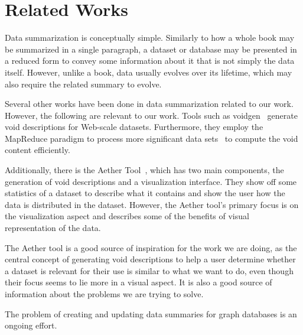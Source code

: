 \section{Related Works}\label{sec:related-works}
Data summarization is conceptually simple. Similarly to how a whole book may be summarized in a single paragraph, a dataset or database may be presented in a reduced form to convey some information about it that is not simply the data itself. However, unlike a book, data usually evolves over its lifetime, which may also require the related summary to evolve.

Several other works have been done in data summarization related to our work. However, the following are relevant to our work. Tools such as voidgen~\cite{creating-void-descriptions} generate \gls{void} descriptions for Web-scale datasets. Furthermore, they employ the MapReduce paradigm to process more significant data sets~\cite{the-mapreduce-paradigm} to compute the \gls{void} content efficiently.

Additionally, there is the Aether Tool~\cite{aether-tool}, which has two main components, the generation of \gls{void} descriptions and a visualization interface. They show off some statistics of a dataset to describe what it contains and show the user how the data is distributed in the dataset. However, the Aether tool's primary focus is on the visualization aspect and describes some of the benefits of visual representation of the data.

The Aether tool is a good source of inspiration for the work we are doing, as the central concept of generating \gls{void} descriptions to help a user determine whether a dataset is relevant for their use is similar to what we want to do, even though their focus seems to lie more in a visual aspect. It is also a good source of information about the problems we are trying to solve.

The problem of creating and updating data summaries for graph databases is an ongoing effort.



